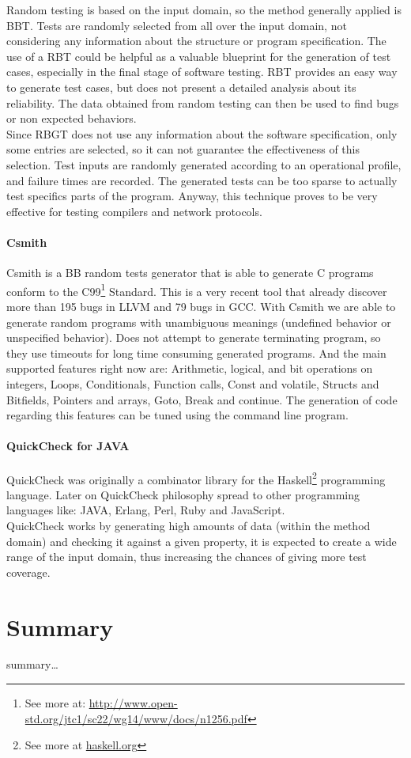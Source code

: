 Random testing is based on the input domain, so the method generally applied is \ac{BBT}.
Tests are randomly selected from all over the input domain, not considering any information about the structure or program specification.
The use of a \ac{RBT} could be helpful as a valuable blueprint for the generation of test cases, especially in the final stage of software testing\cite{reliable}.
\ac{RBT} provides an easy way to generate test cases,
but does not present a detailed analysis about its reliability.
The data obtained from random testing can then be used to find bugs or non expected behaviors.\\
Since \ac{RBGT} does not use any information about the software specification, only some entries are selected, so it can not guarantee the effectiveness of this selection.
Test inputs are randomly generated according to an operational profile, and failure times are recorded.
The generated tests can be too sparse to actually test specifics parts of the program. Anyway, this technique proves to be very effective for testing
compilers and network protocols.

\paragraph{Csmith}
Csmith\cite{Yang:2011:FUB:1993316.1993532} is a \ac{BB} random tests generator that is able to generate C programs
conform to the C99\footnote{See more at: \url{http://www.open-std.org/jtc1/sc22/wg14/www/docs/n1256.pdf}} Standard. This is a very recent tool that already discover
more than 195 bugs in \ac{LLVM} and 79 bugs in \ac{GCC}. With Csmith we are able to generate random programs with unambiguous meanings (undefined behavior or 
unspecified behavior). Does not attempt to generate terminating program, so they use timeouts for long time consuming generated programs.
And the main supported features right now are: Arithmetic, logical, and bit operations on integers, Loops, Conditionals, Function calls, Const and volatile,
Structs and Bitfields, Pointers and arrays, Goto, Break and continue. The generation of code regarding this features can be tuned using the command line program.

\paragraph{QuickCheck for JAVA}
QuickCheck was originally a combinator library for the Haskell\footnote{See more at \url{haskell.org}} programming language\cite{Claessen:2000:QLT:357766.351266}.
Later on QuickCheck philosophy spread to other programming languages like: JAVA, Erlang, Perl, Ruby and JavaScript.\\
QuickCheck works by generating high amounts of data (within the method domain) and checking it against a given property,
it is expected to create a wide range of the input domain, thus increasing the chances of giving more test coverage.

\section{Summary}
summary\ldots
\secendnote
